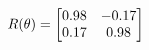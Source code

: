 \documentclass[preview]{standalone}
\begin{document}
\begin{align*}
\special{dvisvgm:raw <g id='unique000'>}R(\theta) = \begin{bmatrix}0.98 & -0.17\\0.17 & 0.98\end{bmatrix}\special{dvisvgm:raw </g>}
\end{align*}
\end{document}
